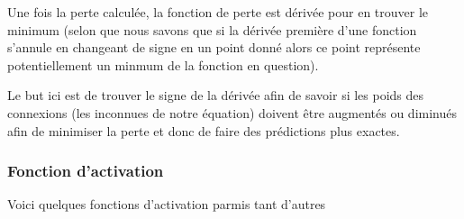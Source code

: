 \begin{itemize}[label=•]
                \par Une fois la perte calculée, la fonction de perte est dérivée pour en trouver le minimum (selon que nous savons que si la dérivée première d’une fonction s’annule en changeant de signe en un point donné alors ce point représente potentiellement un minmum de la fonction en question).\\
                \par Le but ici est de trouver le signe de la dérivée afin de savoir si les poids des connexions (les inconnues de notre équation) doivent être augmentés ou diminués afin de minimiser la perte et donc de faire des prédictions plus exactes.
                
            \end{itemize}

            \subsubsection{Fonction d'activation}
            \par Voici quelques fonctions d'activation parmis tant d'autres
            
